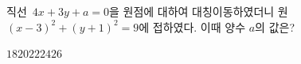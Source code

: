 직선~$4x+3y+a=0$을 원점에 대하여 대칭이동하였더니 원~$(x-3)^2+(y+1)^2=9$에 접하였다. 이때 양수 $a$의 값은?
\begin{choices32}{$18$}{$20$}{$22$}{$24$}{$26$}\end{choices32}
